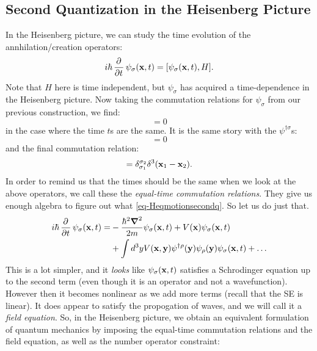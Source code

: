 \subsection{Second Quantization in the Heisenberg Picture}
In the Heisenberg picture, we can study the time evolution of the annhilation/creation operators:
\begin{equation}\label{eq-Heqmotionsecondq}
    i\hbar\dpd{}{t}\psi_\sigma(\v{x}, t) = [\psi_\sigma(\v{x}, t), H].
\end{equation}
Note that $H$ here is time independent, but $\psi_\sigma$ has acquired a time-dependence in the Heisenberg picture. Now taking the commutation relations for $\psi_\sigma$ from our previous construction, we find:
\begin{equation}
    [\psi_{\sigma_1}(\v{x}_1, t), \psi_{\sigma_2}(\v{x}_2, t)] = 0
\end{equation}
in the case where the time $t$s are the same. It is the same story with the $\psi^{\dag\sigma}$s:
\begin{equation}
    [\psi^{\dag\sigma_1}(\v{x}_1, t), \psi^{\dag\sigma_2}(\v{x}_2, t)] = 0
\end{equation}
and the final commutation relation:
\begin{equation}
    [\psi_{\sigma_1}(\v{x}_1, t), \psi^{\dag\sigma_2}(\v{x}_2, t)] = \delta_{\sigma_1}^{\sigma_2}\delta^3(\v{x}_1 - \v{x}_2).
\end{equation}
In order to remind us that the times should be the same when we look at the above operators, we call these the \emph{equal-time commutation relations}. They give us enough algebra to figure out what \eqref{eq-Heqmotionsecondq}. So let us do just that.
\begin{equation}
    \begin{split}
        i\hbar \dpd{}{t}\psi_\sigma(\v{x}, t) = &-\frac{\hbar^2\nabla^2}{2m}\psi_\sigma(\v{x}, t) + V(\v{x})\psi_\sigma(\v{x}, t)
        \\ &+ \int d^3 y V(\v{x}, \v{y})\psi^{\dag\rho}(\v{y})\psi_\rho(\v{y})\psi_\sigma(\v{x}, t) + \ldots
    \end{split}
\end{equation}
This is a lot simpler, and it \emph{looks} like $\psi_\sigma(\mathbf{x}, t)$ satisfies a Schrodinger equation up to the second term (even though it is an operator and not a wavefunction). However then it becomes nonlinear as we add more terms (recall that the SE is linear). It does appear to satisfy the propogation of waves, and we will call it a \emph{field equation}. So, in the Heisenberg picture, we obtain an equivalent formulation of quantum mechanics by imposing the equal-time commutation relations and the field equation, as well as the number operator constraint:
